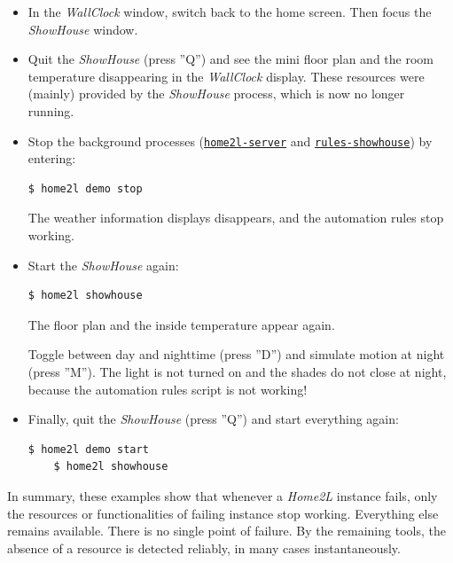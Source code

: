 \documentclass[12pt,english,parskip=half,headheight=19pt]{scrreprt}
\newcommand{\idx}[1]{#1\index{#1}}
\newcommand{\reftool}[1]{\hyperref[tool:#1]{\texttt{\idx{#1}}}}
\begin{document}
\begin{itemize}[$\blacktriangleright$]

  \item
    In the \textit{WallClock} window, switch back to the home screen.
    Then focus the \textit{ShowHouse} window.

  \item
    Quit the \textit{ShowHouse} (press ''Q'') and see the mini floor plan and the room temperature
    disappearing in the \textit{WallClock} display. These resources were (mainly) provided
    by the \textit{ShowHouse} process, which is now no longer running.

  \item
    Stop the background processes (\reftool{home2l-server} and \reftool{rules-showhouse}) by entering:
    \begin{lstlisting}[language=bash]
    $ home2l demo stop
    \end{lstlisting}
    The weather information displays disappears, and the automation rules stop working.

  \item
    Start the \textit{ShowHouse} again:
    \begin{lstlisting}[language=bash]
    $ home2l showhouse
    \end{lstlisting}
    The floor plan and the inside temperature appear again.

    Toggle between day and nighttime (press ''D'') and simulate motion at night (press ''M'').
    The light is not turned on and the shades do not close at night, because the automation rules
    script is not working!

  \item
    Finally, quit the \textit{ShowHouse} (press ''Q'') and start everything again:
    \begin{lstlisting}[language=bash]
    $ home2l demo start
    $ home2l showhouse
    \end{lstlisting}

\end{itemize}

In summary, these examples show that whenever a \textit{Home2L} instance fails, only the resources or functionalities of failing instance stop working. Everything else remains available. There is no single point of failure. By the remaining tools, the absence of a resource is detected reliably, in many cases instantaneously.
\end{document}
